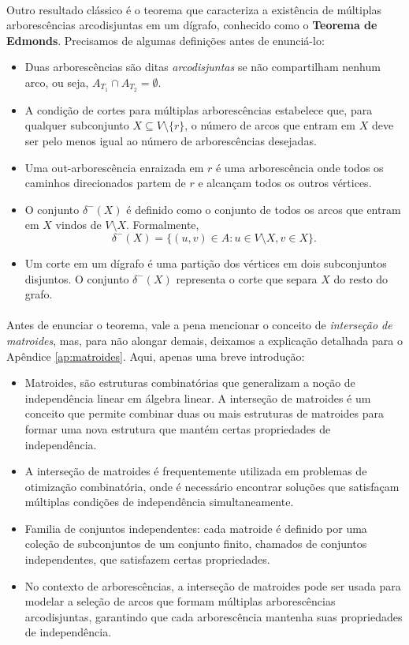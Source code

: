 \documentclass[12pt,a4paper]{article}
\begin{document}
\paragraph{}
Outro resultado clássico é o teorema que caracteriza a existência de múltiplas arborescências arcodisjuntas em um dígrafo, conhecido como o \textbf{Teorema de Edmonds}. Precisamos de algumas definições antes de enunciá-lo:

\begin{itemize}
    \item Duas arborescências são ditas \emph{arcodisjuntas} se não compartilham nenhum arco, ou seja, \(A_{T_1} \cap A_{T_2} = \emptyset\).
    \item A condição de cortes para múltiplas arborescências estabelece que, para qualquer subconjunto \(X \subseteq V \setminus \{r\}\), o número de arcos que entram em \(X\) deve ser pelo menos igual ao número de arborescências desejadas.
    \item Uma out-arborescência enraizada em \(r\) é uma arborescência onde todos os caminhos direcionados partem de \(r\) e alcançam todos os outros vértices.
    \item O conjunto \(\delta^-(X)\) é definido como o conjunto de todos os arcos que entram em \(X\) vindos de \(V \setminus X\). Formalmente,
    \[
    \delta^-(X) = \{(u, v) \in A : u \in V \setminus X, v \in X\}.
    \]
    \item Um corte em um dígrafo é uma partição dos vértices em dois subconjuntos disjuntos. O conjunto \(\delta^-(X)\) representa o corte que separa \(X\) do resto do grafo.
    \end{itemize}

\paragraph{}
Antes de enunciar o teorema, vale a pena mencionar o conceito de \emph{interseção de matroides}, mas, para não alongar demais, deixamos a explicação detalhada para o Apêndice \ref{ap:matroides}. Aqui, apenas uma breve introdução:
\begin{itemize}
    \item Matroides, são estruturas combinatórias que generalizam a noção de independência linear em álgebra linear. A interseção de matroides é um conceito que permite combinar duas ou mais estruturas de matroides para formar uma nova estrutura que mantém certas propriedades de independência.
    \item A interseção de matroides é frequentemente utilizada em problemas de otimização combinatória, onde é necessário encontrar soluções que satisfaçam múltiplas condições de independência simultaneamente.
    \item Familia de conjuntos independentes: cada matroide é definido por uma coleção de subconjuntos de um conjunto finito, chamados de conjuntos independentes, que satisfazem certas propriedades.
    \item No contexto de arborescências, a interseção de matroides pode ser usada para modelar a seleção de arcos que formam múltiplas arborescências arcodisjuntas, garantindo que cada arborescência mantenha suas propriedades de independência.
\end{itemize}
\end{document}
